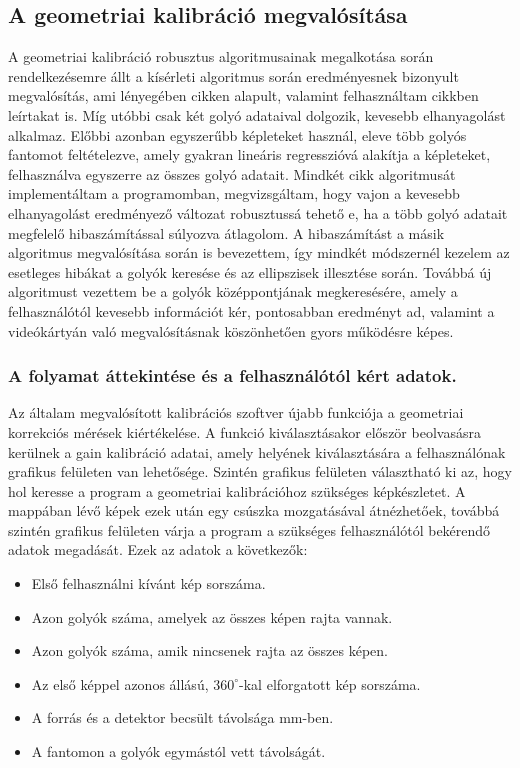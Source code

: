 \documentclass[a4paper,12pt]{article}
\begin{document}
\subsection{A geometriai kalibráció megvalósítása}



A geometriai kalibráció robusztus algoritmusainak megalkotása során rendelkezésemre állt a kísérleti algoritmus során eredményesnek bizonyult megvalósítás\cite{botond}, ami lényegében  cikken alapult,  valamint felhasználtam   cikkben leírtakat is. Míg utóbbi csak két golyó adataival dolgozik, kevesebb elhanyagolást alkalmaz. Előbbi azonban egyszerűbb képleteket használ, eleve több golyós fantomot feltételezve, amely gyakran lineáris regresszióvá alakítja a képleteket, felhasználva egyszerre az összes golyó adatait. Mindkét cikk algoritmusát implementáltam a programomban, megvizsgáltam, hogy vajon a kevesebb elhanyagolást eredményező változat robusztussá tehető e, ha a több golyó adatait megfelelő hibaszámítással súlyozva átlagolom. A hibaszámítást a másik algoritmus megvalósítása során is bevezettem, így mindkét módszernél kezelem az esetleges hibákat a golyók keresése és az ellipszisek illesztése során. Továbbá új algoritmust vezettem be a golyók középpontjának megkeresésére, amely a felhasználótól kevesebb információt kér, pontosabban eredményt ad, valamint a videókártyán való megvalósításnak köszönhetően gyors működésre képes.


\subsubsection{ A folyamat áttekintése és a felhasználótól kért adatok. }


Az általam megvalósított kalibrációs szoftver újabb funkciója a geometriai korrekciós mérések kiértékelése. A funkció kiválasztásakor először beolvasásra kerülnek a gain kalibráció adatai, amely helyének kiválasztására a felhasználónak grafikus felületen van lehetősége. Szintén grafikus felületen választható ki az, hogy hol keresse a program a geometriai kalibrációhoz szükséges képkészletet. A mappában lévő képek ezek után egy csúszka mozgatásával átnézhetőek, továbbá szintén grafikus felületen várja a program a szükséges felhasználótól bekérendő adatok megadását. Ezek az adatok a következők:

\begin{itemize}
  \item Első felhasználni kívánt kép sorszáma.
  \item Azon golyók száma, amelyek az összes képen rajta vannak.
  \item Azon golyók száma, amik nincsenek rajta az összes képen.
  \item Az első képpel azonos állású, $360^\circ$-kal elforgatott kép sorszáma.
  \item A forrás és a detektor becsült távolsága mm-ben.
    \item A fantomon a golyók egymástól vett távolságát.
\end{itemize}
\end{document}
